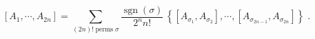\begin{equation}
\left[  A_{1},\cdots,A_{2n}\right]  =\sum_{\left(  2n\right)  !\;\text{perms}%
\;\sigma}\frac{\operatorname{sgn}\left(  \sigma\right)  }{2^{n}n!}\,\left\{
\left[  A_{\sigma_{1}},A_{\sigma_{2}}\right]  ,\cdots,\left[  A_{\sigma
_{2n-1}},A_{\sigma_{2n}}\right]  \right\}  \;.
\end{equation}

